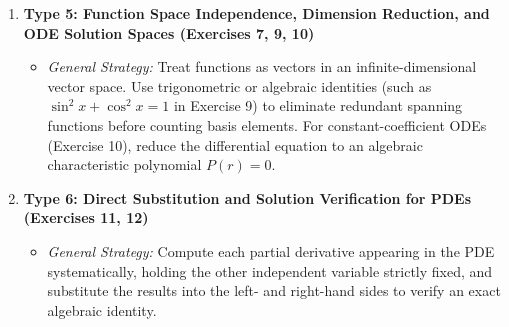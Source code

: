 \documentclass[11pt,a4paper]{article}
\begin{document}
\begin{enumerate}
\begin{itemize}
    \end{itemize}
    \item \textbf{Type 5: Function Space Independence, Dimension Reduction, and ODE Solution Spaces (Exercises 7, 9, 10)}
    \begin{itemize}
        \item \emph{General Strategy:} Treat functions as vectors in an infinite-dimensional vector space. Use trigonometric or algebraic identities (such as $\sin^2 x + \cos^2 x = 1$ in Exercise 9) to eliminate redundant spanning functions before counting basis elements. For constant-coefficient ODEs (Exercise 10), reduce the differential equation to an algebraic characteristic polynomial $P(r) = 0$.
    \end{itemize}
    \item \textbf{Type 6: Direct Substitution and Solution Verification for PDEs (Exercises 11, 12)}
    \begin{itemize}
        \item \emph{General Strategy:} Compute each partial derivative appearing in the PDE systematically, holding the other independent variable strictly fixed, and substitute the results into the left- and right-hand sides to verify an exact algebraic identity.
    \end{itemize}
\end{enumerate}
\end{document}
